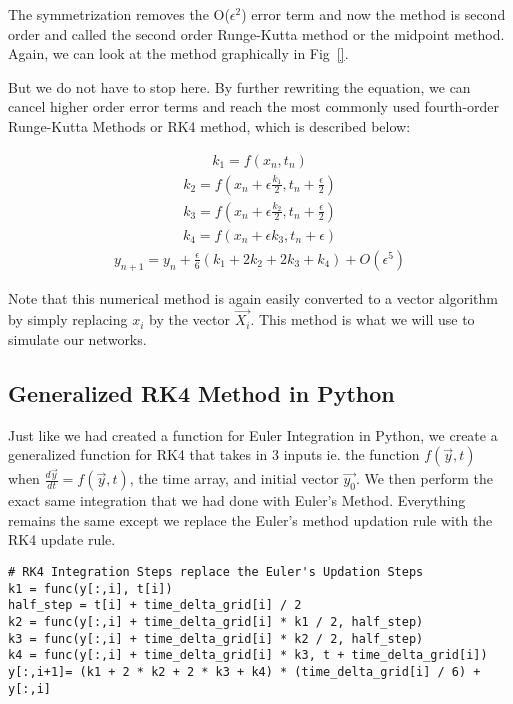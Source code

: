 \documentclass[10pt,letterpaper]{article}
\begin{document}
The symmetrization removes the O($\epsilon^2$) error term and now the method is second order and called the second order Runge-Kutta method or the midpoint method. Again, we can look at the method graphically in Fig~\ref{}.

But we do not have to stop here. By further rewriting the equation, we can cancel higher order error terms and reach the most commonly used fourth-order Runge-Kutta Methods or RK4 method, which is described below:

\begin{eqnarray}k_1=f(x_n,t_n)\end{eqnarray}
\begin{eqnarray}k_2=f(x_n+\epsilon\frac{k_1}{2},t_n+\frac{\epsilon}{2})\end{eqnarray}
\begin{eqnarray}k_3=f(x_n+\epsilon\frac{k_2}{2},t_n+\frac{\epsilon}{2})\end{eqnarray}
\begin{eqnarray}k_4=f(x_n+\epsilon k_3,t_n+\epsilon)\end{eqnarray}
\begin{eqnarray}y_{n+1}=y_n+\frac{\epsilon}{6}(k_1+2 k_2+2 k_3+k_4)+O(\epsilon^5)\end{eqnarray}

Note that this numerical method is again easily converted to a vector algorithm by simply replacing $x_i$ by the vector $\vec{X_i}$. This method is what we will use to simulate our networks.


\subsection*{Generalized RK4 Method in Python}

Just like we had created a function for Euler Integration in Python, we create a generalized function for RK4 that takes in 3 inputs ie. the function $f(\vec{y},t)$ when $\frac{d\vec{y}}{dt}=f(\vec{y},t)$, the time array, and initial vector $\vec{y_0}$. We then perform the exact same integration that we had done with Euler's Method. Everything remains the same except we replace the Euler's method updation rule with the RK4 update rule.

\begin{verbatim}
# RK4 Integration Steps replace the Euler's Updation Steps
k1 = func(y[:,i], t[i])                               
half_step = t[i] + time_delta_grid[i] / 2
k2 = func(y[:,i] + time_delta_grid[i] * k1 / 2, half_step)
k3 = func(y[:,i] + time_delta_grid[i] * k2 / 2, half_step)
k4 = func(y[:,i] + time_delta_grid[i] * k3, t + time_delta_grid[i])
y[:,i+1]= (k1 + 2 * k2 + 2 * k3 + k4) * (time_delta_grid[i] / 6) + y[:,i]
\end{verbatim}
\end{document}
